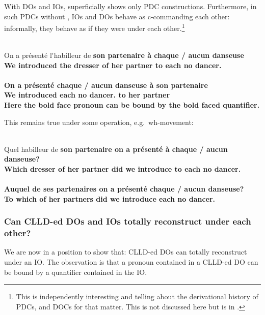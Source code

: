 \documentclass[output=paper]{langsci/langscibook}
\begin{document}
With \glspl{DO} and \glspl{IO},  superficially shows only \gls{PDC} constructions.
Furthermore, in such \glspl{PDC} without  , IOs and DOs
behave as c-commanding each other: informally, they behave as if they were
under each other.\footnote{This is independently interesting and telling about
the derivational history of \glspl{PDC}, and \glspl{DOC} for that matter. This
is  not discussed here but is in  \citealp{Sportiche2017}.}

\ea \label{doio1}
\\
\gll On a  pr\'{e}sent\'{e} l\'{}habilleur de \bf{son} partenaire \`{a} \textbf{chaque} / \textbf{aucun} danseuse\\
We {} introduced {the dresser} of her partner to each {} no dancer.\glossF{} \\
\\
\gll On a  pr\'{e}sent\'{e} \textbf{chaque} / \textbf{aucun} danseuse \`{a} \bf{son} partenaire\\
We {} introduced each {} no dancer.\glossF{} to her partner\\
\z
\z
%
Here the bold face pronoun can be bound by the bold faced quantifier.

This remains true under some  operation, e.g.\ wh-movement:

\ea \label{doio2}
\\
\gll Quel habilleur de \bf{son} partenaire on a  pr\'{e}sent\'{e}  \`{a} \textbf{chaque} / \textbf{aucun} danseuse?\\
  Which dresser of her {partner did} we {} introduce to each {} no dancer.\glossF{} \\
\\
\gll  Auquel de  \bf{ses} partenaires on a  pr\'{e}sent\'{e} \textbf{chaque} / \textbf{aucun} danseuse?\\
{To which} of her {partners did} we {} introduce each {} no dancer.\glossF{} \\
\z
\z

\subsubsection{Can CLLD-ed DOs and IOs totally reconstruct
under each other?}\label{frozenscope}

We are now in a position to show that: \gls{CLLD}-ed \glspl{DO} can
totally reconstruct under an  IO. The observation is that a pronoun contained
in a \gls{CLLD}-ed \gls{DO} can be bound by a quantifier contained in the
\gls{IO}.
\end{document}
